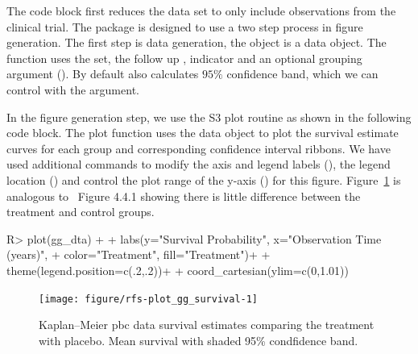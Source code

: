 \documentclass[nojss]{jss}\usepackage[]{graphicx}\usepackage[]{color}
\begin{document}
\begin{Schunk}
\end{Schunk}

The code block first reduces the  data set to only include observations from the clinical trial. The  package is designed to use a two step process in figure generation. The first step is data generation, the  object is a  data object. The  function uses the  set, the follow up ,  indicator and an optional grouping argument (). By default  also calculates $95\%$ confidence band, which we can control with the  argument.

In the figure generation step, we use the  S3 plot routine  as shown in the following code block. The plot function uses the data object to plot the survival estimate curves for each group and corresponding confidence interval ribbons. We have used additional  commands to modify the axis and legend labels (), the legend location () and control the plot range of the y-axis () for this figure. Figure~\ref{fig:plot_gg_survival} is analogous to~\cite{fleming:1991} Figure 4.4.1 showing there is little difference between the treatment and control groups. 

\begin{Schunk}
\begin{Sinput}
R> plot(gg_dta) +
+   labs(y="Survival Probability", x="Observation Time (years)", 
+        color="Treatment", fill="Treatment")+
+   theme(legend.position=c(.2,.2))+
+   coord_cartesian(ylim=c(0,1.01))
\end{Sinput}
\begin{figure}[!htpb]

{\centering \texttt{[image: figure/rfs-plot\_gg\_survival-1]} 

}

\caption[Kaplan--Meier pbc data survival estimates comparing the treatment with placebo]{Kaplan--Meier pbc data survival estimates comparing the treatment with placebo. Mean survival with shaded 95\% condfidence band.\label{fig:plot_gg_survival}}
\end{figure}
\end{Schunk}
\end{document}
